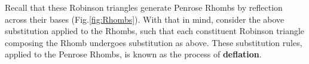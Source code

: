 \documentclass[]{article}
\begin{document}
Recall that these Robinson triangles generate Penrose Rhombs by reflection across their bases (Fig.\ref{fig:Rhombs}). With that in mind, consider the above substitution applied to the Rhombs, such that each constituent Robinson triangle composing the Rhomb undergoes substitution as above. These substitution rules, applied to the Penrose Rhombs, is known as the process of \textbf{deflation}.

\begin{figure}[H]
        \centering
        \begin{subfigure}[t]{\textwidth}
        \begin{subfigure}[t]{0.4\textwidth}
                \centering
        \end{subfigure}\hfill \raisebox{75px}{\huge$\rightarrow$} \hfill%
        ~ %
        \begin{subfigure}[t]{0.4\textwidth}
                \centering

\end{subfigure}
\end{subfigure}
\end{figure}
\end{document}
